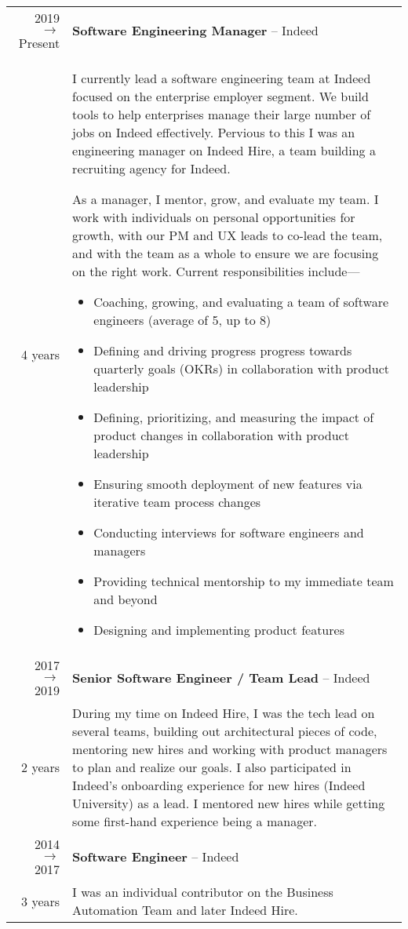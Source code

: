\documentclass[11pt]{amsart}
\begin{document}
\begin{tabularx}{\textwidth}{@{}r | X@{}}
2019 $\rightarrow$ Present &  \textbf{Software Engineering Manager} – Indeed  \\
\small{4 years}  & I currently lead a software engineering team at Indeed focused on the enterprise employer segment. We build tools to help enterprises manage their large number of jobs on Indeed effectively. Pervious to this I was an engineering manager on Indeed Hire, a team building a recruiting agency for Indeed.

\bigskip
As a manager, I mentor, grow, and evaluate my team. I work with individuals on personal opportunities for growth, with our PM and UX leads to co-lead the team, and with the team as a whole to ensure we are focusing on the right work. Current responsibilities include—
\bigskip
\begin{itemize}[noitemsep, leftmargin=2em, label=\raisebox{0.25ex}{\tiny$\bullet$}]
\item Coaching, growing, and evaluating a team of software engineers (average of 5, up to 8)
\item Defining and driving progress progress towards quarterly goals (\textsc{OKR}s) in collaboration with product leadership
\item Defining, prioritizing, and measuring the impact of product changes in collaboration with product leadership
\item Ensuring smooth deployment of new features via iterative team process changes
\item Conducting interviews for software engineers and managers
\item Providing technical mentorship to my immediate team and beyond
\item Designing and implementing product features
\end{itemize}

\\
2017 $\rightarrow$  2019 &  \textbf{Senior Software Engineer / Team Lead} – Indeed \\ 
\small{2 years}  & During my time on Indeed Hire, I was the tech lead on several teams, building out architectural pieces of code, mentoring new hires and working with product managers to plan and realize our goals. I also participated in Indeed's onboarding experience for new hires (Indeed University) as a lead. I mentored new hires while getting some first-hand experience being a manager.

 \\
2014 $\rightarrow$  2017  & \textbf{Software Engineer} – Indeed \\ 
\small{3 years}  & I was an individual contributor on the Business Automation Team and later Indeed Hire. \\
\end{tabularx}
\end{document}
